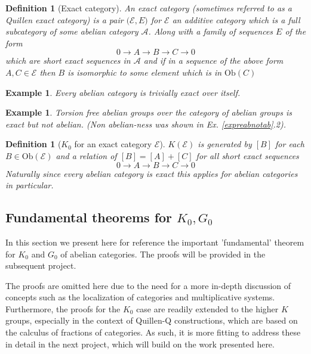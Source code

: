 \documentclass[12pt]{article}
\numberwithin{equation}{section}
\newcounter{dummy} \numberwithin{dummy}{section}
\newtheorem{definition}[dummy]{Definition}
\newtheorem{example}[dummy]{Example}
\begin{document}
	\begin{definition}[Exact category]
		An exact category (sometimes referred to as a Quillen exact category) is a pair $\mathcal{(E},E)$ for $\mathcal{E}$ an additive category which is a full subcategory of some abelian category $\mathcal{A}$. Along with a family of sequences $E$ of the form \[ 0 \to A \to B \to C \to 0 \] which are short exact sequences in $\mathcal{A}$ and if in a sequence of the above form $A, C \in \mathcal{E}$ then $B $ is isomorphic to some element which is in $\mathrm{Ob}(C)$
	\end{definition}
	\begin{example}
		Every abelian category is trivially exact over itself.
	\end{example}
	\begin{example}Torsion free abelian groups over the category of abelian groups is exact but not abelian. (Non abelian-ness was shown in Ex. \ref{expreabnotab}.2).
	\end{example}
	
	\begin{definition}[$K_0$ for an exact category $\mathcal{E}$]
		$K(\mathcal E)$ is generated by $[B]$ for each $B \in \mathrm{Ob}(\mathcal{E})$ and a relation of $[B]=[A]+[C]$ for all short exact sequences \[ 0 \to A \to B \to C \to 0 \]
		Naturally since every abelian category is exact this applies for abelian categories in particular.
	\end{definition}
	
	\subsection{Fundamental theorems for $K_0,G_0$}
	In this section we present here for reference the important 'fundamental' theorem for $K_0$ and $G_0$ of abelian categories. The proofs will be provided in the subsequent project. 
	
	The proofs are omitted here due to the need for a more in-depth discussion of concepts such as the localization of categories and multiplicative systems. Furthermore, the proofs for the $K_0$ case are readily extended to the higher $K$ groups, especially in the context of Quillen-Q constructions, which are based on the calculus of fractions of categories. As such, it is more fitting to address these in detail in the next project, which will build on the work presented here.
	
\end{document}

